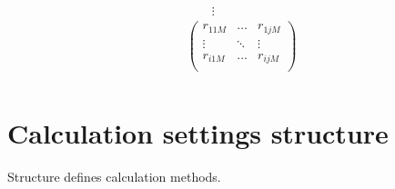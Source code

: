 \documentclass[12pt,a4paper,oneside]{report} %
\begin{document}
\begin{eqnarray*}
                            & \qquad\vdots                        \\
                            & \left(    \begin{array}{ccc}
                                                r_{11M}  & \hdots & r_{1jM} \\
                                                \vdots  & \ddots & \vdots \\
                                                r_{i1M}  & \hdots & r_{ijM} \\
                                        \end{array}\right) \\
\end{eqnarray*}

\section{Calculation settings structure} %
\label{structcalcset}
Structure defines calculation methods.
\end{document}
